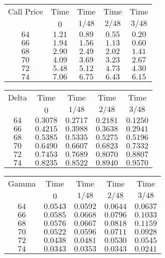 \documentclass{ximera}
\begin{document}
\begin{center}
	\begin{tabular}{c|cccc}
	Call Price	& Time 	& Time 		& Time 		& Time\\
		 	& $0$ 		& $1/48$ 		& $2/48$ 		& $3/48$\\
	\hline
	$64$		& $1.21$	& $0.89$		& $0.55$		& $0.20$\\
	$66$		& $1.94$	& $1.56$		& $1.13$		& $0.60$\\
	$68$		& $2.90$	& $2.49$		& $2.02$		& $1.41$\\
	$70$		& $4.09$	& $3.69$		& $3.23$		& $2.67$\\
	$72$		& $5.48$	& $5.12$		& $4.73$		& $4.30$\\
	$74$		& $7.06$	& $6.75$		& $6.43$		& $6.15$
	\end{tabular}

\vspace{25pt}

	\begin{tabular}{c|cccc}
	Delta 		& Time 	& Time 		& Time 		& Time\\
		 	& $0$ 		& $1/48$ 		& $2/48$ 		& $3/48$\\
	\hline
	$64$		& $0.3078$	& $0.2717$		& $0.2181$		& $0.1250$\\
	$66$		& $0.4215$	& $0.3988$		& $0.3638$		& $0.2941$\\
	$68$		& $0.5385$	& $0.5335$		& $0.5275$		& $0.5196$\\
	$70$		& $0.6490$	& $0.6607$		& $0.6823$		& $0.7332$\\
	$72$		& $0.7453$	& $0.7689$		& $0.8070$		& $0.8807$\\
	$74$		& $0.8235$	& $0.8522$		& $0.8940$		& $0.9570$
	\end{tabular}

\vspace{25pt}

	\begin{tabular}{c|cccc}
	Gamma	& Time 	& Time 		& Time 		& Time\\
			& $0$ 		& $1/48$ 		& $2/48$ 		& $3/48$\\
	\hline
	$64$		& $0.0543$	& $0.0592$		& $0.0644$		& $0.0637$\\
	$66$		& $0.0585$	& $0.0668$		& $0.0796$		& $0.1033$\\
	$68$		& $0.0576$	& $0.0667$		& $0.0818$		& $0.1159$\\
	$70$		& $0.0522$	& $0.0596$		& $0.0711$		& $0.0928$\\
	$72$		& $0.0438$	& $0.0481$		& $0.0530$		& $0.0545$\\
	$74$		& $0.0343$	& $0.0353$		& $0.0343$		& $0.0241$
	\end{tabular}


\end{center}
\end{document}

